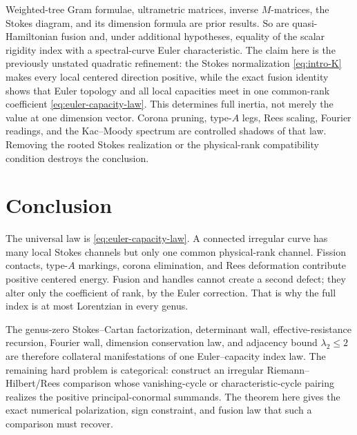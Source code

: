 \documentclass[11pt,a4paper]{amsart}
\theoremstyle{plain}
\theoremstyle{definition}
\begin{document}
Weighted-tree Gram formulae, ultrametric matrices, inverse $M$-matrices, the Stokes diagram, and its
dimension formula are prior results.  So are quasi-Hamiltonian fusion and, under additional
hypotheses, equality of the scalar rigidity index with a spectral-curve Euler characteristic.
The claim here is the previously unstated quadratic refinement: the Stokes normalization
\eqref{eq:intro-K} makes every local centered direction positive, while the exact fusion identity
shows that Euler topology and all local capacities meet in one common-rank coefficient
\eqref{eq:euler-capacity-law}.  This determines full inertia, not merely the value at one dimension
vector.  Corona pruning, type-$A$ legs, Rees scaling, Fourier readings, and the Kac--Moody spectrum
are controlled shadows of that law.  Removing the rooted Stokes realization or the physical-rank
compatibility condition destroys the conclusion.

\section{Conclusion}

The universal law is \eqref{eq:euler-capacity-law}.  A connected irregular curve has many local
Stokes channels but only one common physical-rank channel.  Fission contacts, type-$A$ markings,
corona elimination, and Rees deformation contribute positive centered energy.  Fusion and handles
cannot create a second defect; they alter only the coefficient of rank, by the Euler correction.
That is why the full index is at most Lorentzian in every genus.

The genus-zero Stokes--Cartan factorization, determinant wall, effective-resistance recursion,
Fourier wall, dimension conservation law, and adjacency bound $\lambda_2\le2$ are therefore
collateral manifestations of one Euler--capacity index law.  The remaining hard problem is
categorical: construct an irregular Riemann--Hilbert/Rees comparison whose vanishing-cycle or
characteristic-cycle pairing realizes the positive principal-conormal summands.  The theorem here
gives the exact numerical polarization, sign constraint, and fusion law that such a comparison must
recover.
\end{document}
